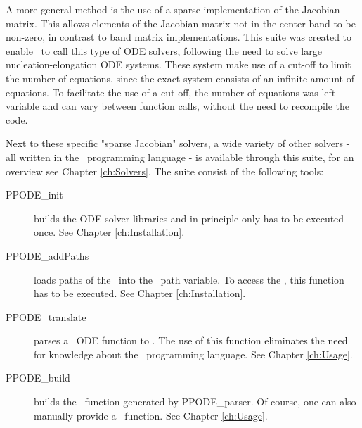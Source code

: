 A more general method is the use of a sparse implementation of the Jacobian matrix. This allows elements of the Jacobian matrix not in the center band to be non-zero, in contrast to band matrix implementations. This suite was created to enable \MATLAB~to call this type of ODE solvers, following the need to solve large nucleation-elongation ODE systems. These system make use of a cut-off to limit the number of equations, since the exact system consists of an infinite amount of equations. To facilitate the use of a cut-off, the number of equations was left variable and can vary between function calls, without the need to recompile the code.

Next to these specific "sparse Jacobian" solvers, a wide variety of other solvers - all written in the \Fortran~programming language - is available through this suite, for an overview see Chapter \ref{ch:Solvers}. The suite consist of the following tools:
\begin{description}
 \item[PPODE\_init] builds the ODE solver libraries and in principle only has to be executed once. See Chapter \ref{ch:Installation}.
 \item[PPODE\_addPaths] loads paths of the \PPODESUITE~into the \MATLAB~path variable. To access the \PPODESUITE, this function has to be executed. See Chapter \ref{ch:Installation}.
 \item[PPODE\_translate] parses a \MATLAB~ODE function to \Fortran. The use of this function eliminates the need for knowledge about the \Fortran~programming language. See Chapter \ref{ch:Usage}.
 \item[PPODE\_build] builds the \Fortran~function generated by PPODE\_parser. Of course, one can also manually provide a \Fortran~function. See Chapter \ref{ch:Usage}.
\end{description}
